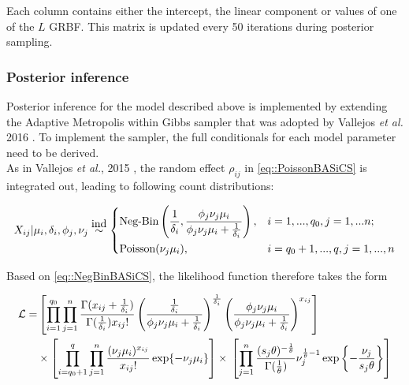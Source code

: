 Each column contains either the intercept, the linear component or values of one of the $L$ GRBF. This matrix is updated every 50 iterations during posterior sampling.

\subsubsection{Posterior inference}

Posterior inference for the model described above is implemented by extending the Adaptive Metropolis within Gibbs sampler \citep{Roberts2009} that was adopted by Vallejos \emph{et al.} 2016 \cite{Vallejos2016}. To implement the sampler, the full conditionals for each model parameter need to be derived. \\

As in Vallejos \emph{et al.}, 2015 \cite{Vallejos2015BASiCS}, the random effect $\rho_{ij}$ in \ref{eq::PoissonBASiCS} is integrated out, leading to following count distributions:

\begin{equation} \label{eq::NegBinBASiCS}
 X_{ij}|\mu_i,\delta_i,\phi_j,\nu_j \stackrel{\mbox{ind}}{\sim}
 \left\lbrace
  \begin{aligned}
    &\text{Neg-Bin}\left(\frac{1}{\delta_i},\frac{\phi_j\nu_j\mu_i}{\phi_j\nu_j\mu_i+\frac{1}{\delta_i}}\right), && i=1,...,q_0,j=1,...n;  \\ 
    &\text{Poisson}(\nu_j\mu_i), && i=q_0+1,...,q,j=1,...,n        
  \end{aligned}
\right.
\end{equation}

Based on \ref{eq::NegBinBASiCS}, the likelihood function therefore takes the form

\begin{align} \label{eq::loglik}
\mathcal{L} = & \left[\prod_{i=1}^{q_0}\prod_{j=1}^n\frac{\Gamma(x_{ij}+\frac{1}{\delta_i})}{\Gamma(\frac{1}{\delta_i})x_{ij}!}\left(\frac{\frac{1}{\delta_i}}{\phi_j\nu_j\mu_i+\frac{1}{\delta_i}}\right)^\frac{1}{\delta_i}\left(\frac{\phi_j\nu_j\mu_i}{\phi_j\nu_j\mu_i+\frac{1}{\delta_i}}\right)^{x_{ij}}\right] \nonumber\\ 
&\times\left[\prod_{i=q_0+1}^{q}\prod_{j=1}^n\frac{(\nu_j\mu_i)^{x_{ij}}}{x_{ij}!}\exp\lbrace-\nu_j\mu_i\rbrace\right]\times{}\left[\prod_{j=1}^n\frac{(s_j\theta)^{-\frac{1}{\theta}}}{\Gamma(\frac{1}{\theta})}\nu_j^{\frac{1}{\theta}-1}\exp\left\lbrace-\frac{\nu_j}{s_j\theta}\right\rbrace\right]
\end{align} 

